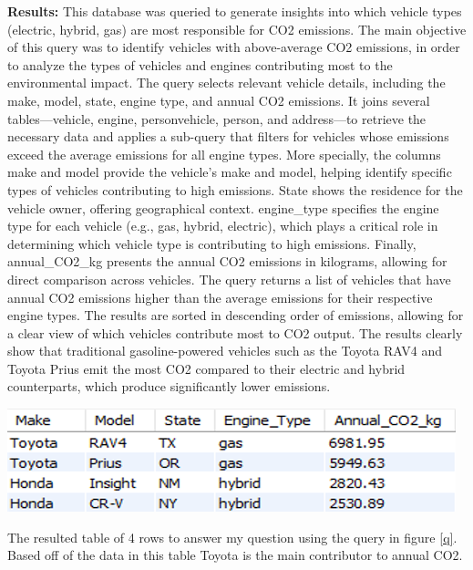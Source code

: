 \documentclass[12pt,letterpaper]{article}
\begin{document}
	\textbf{Results:}
	This database was queried to generate insights into which vehicle types (electric, hybrid, gas) are most responsible for CO2 emissions. The main objective of this query was to identify vehicles with above-average CO2 emissions, in order to analyze the types of vehicles and engines contributing most to the environmental impact. The query selects relevant vehicle details, including the make, model, state, engine type, and annual CO2 emissions. It joins several tables—vehicle, engine, personvehicle, person, and address—to retrieve the necessary data and applies a sub-query that filters for vehicles whose emissions exceed the average emissions for all engine types. More specially, the columns make and model provide the vehicle's make and model, helping identify specific types of vehicles contributing to high emissions. State shows the residence for the vehicle owner, offering geographical context. engine\_type specifies the engine type for each vehicle (e.g., gas, hybrid, electric), which plays a critical role in determining which vehicle type is contributing to high emissions. Finally, annual\_CO2\_kg presents the annual CO2 emissions in kilograms, allowing for direct comparison across vehicles. The query returns a list of vehicles that have annual CO2 emissions higher than the average emissions for their respective engine types. The results are sorted in descending order of emissions, allowing for a clear view of which vehicles contribute most to CO2 output. The results clearly show that traditional gasoline-powered vehicles such as the Toyota RAV4 and Toyota Prius emit the most CO2 compared to their electric and hybrid counterparts, which produce significantly lower emissions. 
	\pagebreak
	\begin{table}[ht]
		\caption{\label{que}}  
		\begin{center}
			\includegraphics[width=\textwidth]{table.png}
		\end{center}
	{The resulted table of 4 rows to answer my question using the query in figure \ref{q}. Based off of the data in this table Toyota is the main contributor to annual CO2.}
	\end{table}
	\pagebreak
\end{document}
